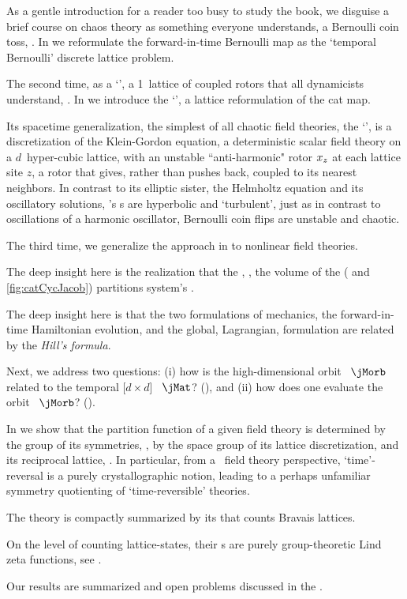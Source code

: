 As a gentle introduction
for a reader too busy to study the book, we
disguise a brief course on chaos theory as something everyone
understands, a Bernoulli coin toss, . In
 we reformulate the for\-ward-in-time Bernoulli map as
the `{temporal Bernoulli}' discrete lattice problem.

The second time,
as a `\templatt', a 1\dmn\ lattice of coupled rotors that all dynamicists
understand, . In  we introduce
the `\templatt', a lattice reformulation of the cat map.

Its spacetime generalization, the simplest of all chaotic field theories,
the `\catlatt', is a discretization of the
Klein-Gordon equation, a deterministic scalar field theory on a $d$\dmn\
hyper-cubic lattice, with an unstable ``anti-harmonic" rotor $x_{z}$
at each lattice site $z$, a rotor that gives, rather than pushes back,
coupled to its nearest neighbors.
In contrast to its elliptic sister, the Helmholtz equation and its
oscillatory solutions, {\catlatt}'s {\lattstate}s are hyperbolic and
`turbulent', just as in contrast to oscillations of a harmonic
oscillator, Bernoulli coin flips are unstable and chaotic.

The third time,
we generalize the approach in  %
to nonlinear field theories.

The deep insight
here is the realization that the {\em\HillDet}, \ie, the volume of the
{\em\jacobianOrb} (\reffig{fig:BernCyc2Jacob} and \ref{fig:catCycJacob})
partitions system's \statesp.

The deep insight here is that the two formulations of mechanics, the
for\-ward-in-time Hamiltonian evolution, and the global, Lagrangian,
{\templatt} formulation are related by the {\em Hill's formula}.

Next, we address two questions:
(i) how is the high-dimensional orbit \jacobianM\ $\jMorb$ related
to the temporal [$d\!\times\!d$] \jacobianM\ $\jMat$?
(),
and
(ii) how does one evaluate the orbit \jacobianM\ $\jMorb$?
().


In  we show that the partition function of a
given field theory is determined by the group of its symmetries, \ie,
by the space group of its lattice discretization,
and its reciprocal lattice, .
In particular, from a \spt\ field theory perspective, `time'-reversal is
a purely crystallographic notion, leading to a perhaps unfamiliar
symmetry quotienting of `time-reversible' theories.

The theory is compactly summarized by its {\tzeta} 
that counts Bravais lattices.

On the level of counting lattice-states, their {\tzeta}s are purely
group-theoretic Lind zeta functions, see \refsect{sect:LC21Lind1d}.

Our results are summarized and open problems discussed in the
.
